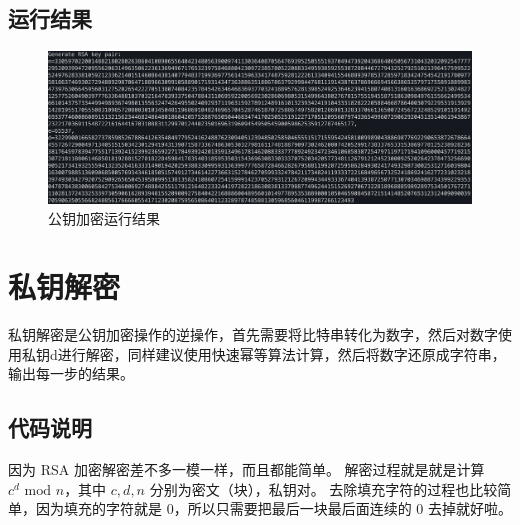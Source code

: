 \documentclass[degree=project,degree-type=project,cjk-font=noto]{thuthesis}
\begin{document}
\subsection{运行结果}

\begin{figure}[h]
\centering%
\includegraphics[width=\linewidth]{rsa_t1.png}
  \caption{公钥加密运行结果}
  \label{fig:t2}
\end{figure}

\section{私钥解密}

私钥解密是公钥加密操作的逆操作，首先需要将比特串转化为数字，然后对数字使用私钥d进行解密，同样建议使用快速幂等算法计算，然后将数字还原成字符串，输出每一步的结果。

\subsection{代码说明}

因为 RSA 加密解密差不多一模一样，而且都能简单。
解密过程就是就是计算 $c^d \text{ mod } n$，其中 $c, d, n$ 分别为密文（块），私钥对。
去除填充字符的过程也比较简单，因为填充的字符就是 0，所以只需要把最后一块最后面连续的 0 去掉就好啦。


\backmatter

\end{document}
